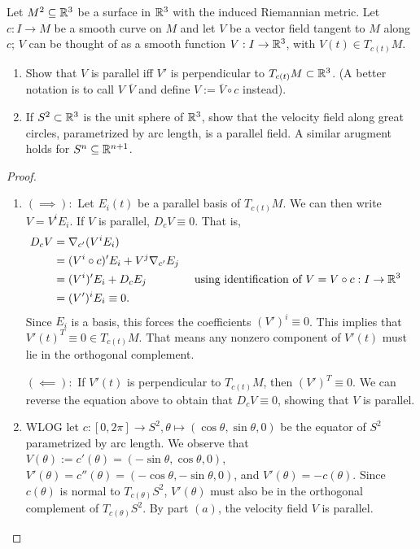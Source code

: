 \documentclass[12pt]{article}
\begin{document}
\begin{problem}[Do Carmo 3.4]
Let $ M^2 \subseteq \mathbb{R}^3$ be a surface in $ \mathbb{R}^3$ with the induced Riemannian metric. Let $ c: I \to M$ be a smooth curve on $ M$ and let  $ V$ be a vector field tangent to  $ M$ along  $ c$;  $ V$ can be thought of as a smooth function  $ V: I \to \mathbb{R}^3$, with $ V(t) \in T_{c(t)}M$.
\begin{enumerate}[label=(\alph*)]
	\item Show that $ V$ is parallel iff  $ V'$ is perpendicular to  $ T_{c(t)}M \subset \mathbb{R}^3$. (A better notation is to call $ V$  $ \overline{V}$ and define $ V:= \overline{V} \circ c$ instead).
	\item If $ S^2 \subset \mathbb{R}^3$ is the unit sphere of $ \mathbb{R}^3$, show that the velocity field along great circles, parametrized by arc length, is a parallel field. A similar arugment holds for $ S^{n} \subseteq \mathbb{R}^{n+1}$.
\end{enumerate}
\end{problem}
\begin{proof}
\begin{enumerate}[label=(\alph*)]
	\item $ (\implies):$ Let $ E_i(t)$ be a parallel basis of $ T_{c(t)}M$. We can then write $ V = V^{i} E_i$. If $ V$ is parallel,  $ D_c V \equiv 0$. That is,
		\begin{align*}
			D_c V &= \nabla_{c'} (V^{i} E_i) \\
			&= (V^{i} \circ c)' E_i + V^{j} \nabla_{c'} E_j  \\
			&= (V^{i})' E_i + D_c E_j && \text{ using identification of }V=V \circ c:I \to \mathbb{R}^3 \\
			&= (V')^{i} E_i \equiv 0.
		\end{align*}
		Since $ E_i$ is a basis, this forces the coefficients $ (V')^{i} \equiv 0$. This implies that $ V'(t)^{T} \equiv 0 \in T_{c(t)}M$. That means any nonzero component of $ V'(t)$ must lie in the orthogonal complement.

		$ (\impliedby): $ If $ V'(t)$ is perpendicular to  $ T_{c(t)} M$, then  $ (V')^{T} \equiv 0$. We can reverse the equation above to obtain that $ D_c V \equiv 0$, showing that  $ V$ is parallel.
	\item WLOG let $ c: [0, 2\pi] \to S^2, \theta \mapsto (\cos \theta, \sin \theta, 0)$ be the equator of  $ S^2$ parametrized by arc length.  We observe that $ V(\theta):= c'(\theta) = (- \sin \theta, \cos \theta,0)$, $ V'(\theta) = c''(\theta) = (-\cos \theta, - \sin \theta,0)$, and $ V'(\theta) = - c(\theta) $. Since $ c(\theta)$ is normal to  $ T_{c(\theta)} S^2$, $ V'(\theta)$ must also be in the orthogonal complement of $ T_{c(\theta)} S^2$. By part $ (a)$, the velocity field  $ V$ is parallel.
\end{enumerate}
\end{proof}
\end{document}
